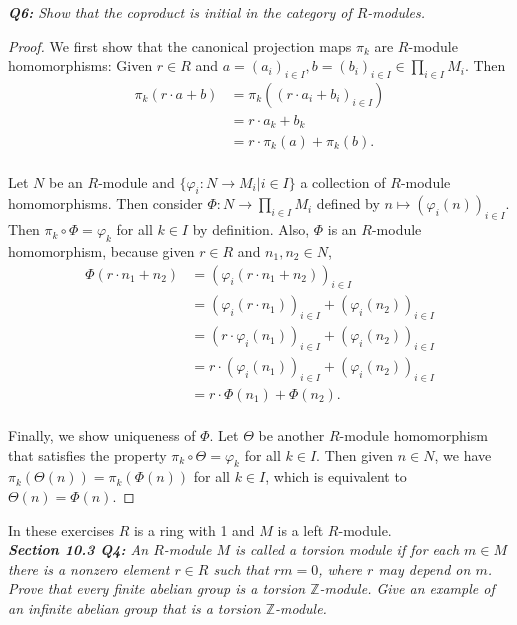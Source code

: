 \documentclass{article}
\begin{document}
\it \textbf{Q6:} Show that the coproduct is initial in the category of
  $R$-modules.
  \begin{proof}
    We first show that the canonical projection maps $\pi_k$ are $R$-module
    homomorphisms: Given $r\in R$ and $a=(a_i)_{i\in I}, b=(b_i)_{i\in I}\in
    \prod_{i\in I}M_i$. Then
    \begin{align*}
      \pi_k(r\cdot a+b) &=\pi_k((r\cdot a_i+b_i)_{i\in I})\\
      &=r\cdot a_k +b_k\\
      &=r\cdot\pi_k(a) +\pi_k(b).\\
    \end{align*}

    Let $N$ be an $R$-module and $\{\varphi_i:N\rightarrow M_i|i\in I\}$ a
    collection of $R$-module homomorphisms. Then consider
    $\Phi:N\rightarrow\prod_{i\in I}M_i$ defined by
    $n\mapsto(\varphi_i(n))_{i\in I}$. Then $\pi_k\circ\Phi=\varphi_k$ for
    all $k\in I$ by definition. Also, $\Phi$ is an $R$-module homomorphism,
    because given $r\in R$ and $n_1,n_2\in N$,
    \begin{align*}
      \Phi(r\cdot n_1+n_2) &=(\varphi_i(r\cdot n_1+n_2))_{i\in I}\\
      &=(\varphi_i(r\cdot n_1))_{i\in I} +(\varphi_i(n_2))_{i\in I}\\
      &=(r\cdot\varphi_i(n_1))_{i\in I} +(\varphi_i(n_2))_{i\in I}\\
      &=r\cdot(\varphi_i(n_1))_{i\in I} +(\varphi_i(n_2))_{i\in I}\\
      &=r\cdot\Phi(n_1) +\Phi(n_2).\\
    \end{align*}

    Finally, we show uniqueness of $\Phi$. Let $\Theta$ be another
    $R$-module homomorphism that satisfies the property
    $\pi_k\circ\Theta=\varphi_k$ for all $k\in I$. Then given $n\in N$, we
    have $\pi_k(\Theta(n))=\pi_k(\Phi(n))$ for all $k\in I$, which is
    equivalent to $\Theta(n)=\Phi(n)$.
  \end{proof}

In these exercises $R$ is a ring with 1 and $M$ is a left $R$-module. \\

\it \textbf{Section 10.3 Q4:} An $R$-module $M$ is called a torsion module
  if for each $m\in M$ there is a nonzero element $r\in R$ such that
  $rm=0$, where $r$ may depend on $m$. Prove that every finite abelian
  group is a torsion $\mathbb{Z}$-module. Give an example of an infinite
  abelian group that is a torsion $\mathbb{Z}$-module.
\end{document}
